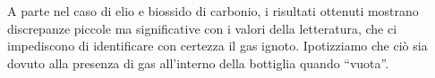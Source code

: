 A parte nel caso di elio e biossido di carbonio, i risultati ottenuti mostrano discrepanze piccole ma significative
con i valori della letteratura, che ci impediscono di identificare con certezza il gas ignoto. Ipotizziamo che ciò sia
dovuto alla presenza di gas all'interno della bottiglia quando ``vuota''.
